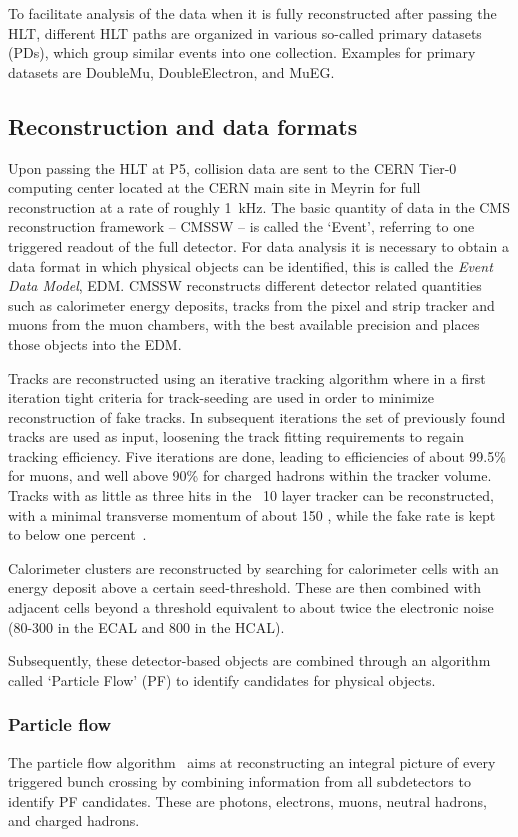 To facilitate analysis of the data when it is fully reconstructed after passing the HLT, different HLT paths are organized in various so-called primary datasets (PDs), which group similar
events into one collection. Examples for primary datasets are DoubleMu, DoubleElectron, and MuEG.

\subsection{Reconstruction and data formats}
\label{sub:cms_reco}
Upon passing the HLT at P5, collision data are sent to the CERN Tier-0 computing center located at the CERN main site in Meyrin for full reconstruction at a rate of roughly \SI{1}{\kilo\hertz}. 
The basic quantity of data in the CMS reconstruction framework -- CMSSW -- is called the `Event', referring to one triggered readout of the full detector. For data analysis it is necessary
to obtain a data format in which physical objects can be identified, this is called the \textit{Event Data Model}, EDM. CMSSW reconstructs different detector related quantities
such as calorimeter energy deposits, tracks from the pixel and strip tracker and muons from the muon chambers, with the best available precision and places those objects into the EDM. 

Tracks are reconstructed using an iterative tracking algorithm where in a first iteration tight criteria for track-seeding are used in order to minimize reconstruction of
fake tracks. In subsequent iterations the set of previously found tracks are used as input, loosening the track fitting requirements to regain tracking efficiency. Five iterations
are done, leading to efficiencies of about 99.5\% for muons, and well above 90\% for charged hadrons within the tracker volume. Tracks with as little as three hits in the ~10 layer
tracker can be reconstructed, with a minimal transverse momentum of about 150 \mev, while the fake rate is kept to below one percent~\cite{pfcms}.

Calorimeter clusters are reconstructed by searching for calorimeter cells with an energy deposit above a certain seed-threshold. These are then combined with adjacent cells
beyond a threshold equivalent to about twice the electronic noise (80-300 \mev in the ECAL and 800 \mev in the HCAL).

Subsequently, these detector-based objects are combined through an algorithm called `Particle Flow' (PF) to identify candidates for physical objects.

\subsubsection*{Particle flow}
The particle flow algorithm~\cite{cmspf} aims at reconstructing an integral picture of every triggered bunch crossing by combining information from all subdetectors to identify
PF candidates. These are photons, electrons, muons, neutral hadrons, and charged hadrons. 

